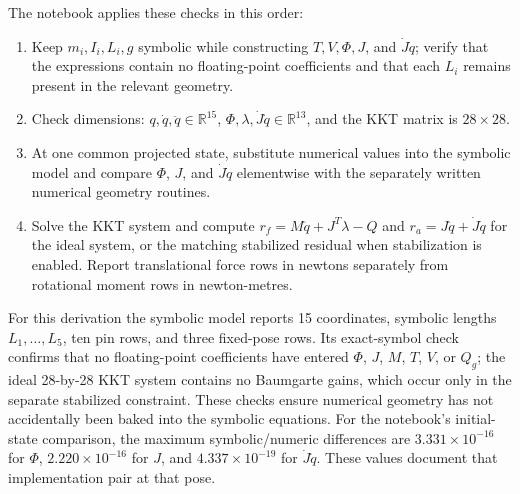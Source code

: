 \documentclass[../main.tex]{subfiles}
\begin{document}
The notebook applies these checks in this order:
\begin{enumerate}
\item Keep $m_i,I_i,L_i,g$ symbolic while constructing $T,V,\Phi,J$, and $\dot J\dot q$; verify that the expressions contain no floating-point coefficients and that each $L_i$ remains present in the relevant geometry.
\item Check dimensions: $q,\dot q,\ddot q\in\mathbb R^{15}$, $\Phi,\lambda,\dot J\dot q\in\mathbb R^{13}$, and the KKT matrix is $28\times28$.
\item At one common projected state, substitute numerical values into the symbolic model and compare $\Phi$, $J$, and $\dot J\dot q$ elementwise with the separately written numerical geometry routines.
\item Solve the KKT system and compute $r_f=M\ddot q+J^T\lambda-Q$ and $r_a=J\ddot q+\dot J\dot q$ for the ideal system, or the matching stabilized residual when stabilization is enabled. Report translational force rows in newtons separately from rotational moment rows in newton-metres.
\end{enumerate}
For this derivation the symbolic model reports 15 coordinates, symbolic lengths $L_1,\ldots,L_5$, ten pin rows, and three fixed-pose rows. Its exact-symbol check confirms that no floating-point coefficients have entered $\Phi$, $J$, $M$, $T$, $V$, or $Q_g$; the ideal 28-by-28 KKT system contains no Baumgarte gains, which occur only in the separate stabilized constraint. These checks ensure numerical geometry has not accidentally been baked into the symbolic equations.
For the notebook's initial-state comparison, the maximum symbolic/numeric differences are $3.331\times10^{-16}$ for $\Phi$, $2.220\times10^{-16}$ for $J$, and $4.337\times10^{-19}$ for $\dot J\dot q$. These values document that implementation pair at that pose.
\end{document}
